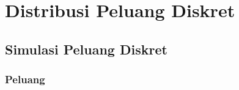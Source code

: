 \pagestyle{headings}
\setcounter{chapter}{0}
\chapter{Distribusi Peluang Diskret} \label{chp 1}
\setcounter{page}{1}

\section{Simulasi Peluang Diskret} \label{sec 1.1}

\subsection*{Peluang}

